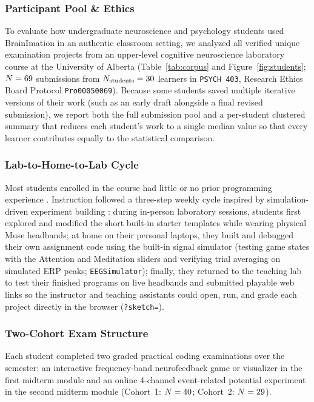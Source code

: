 \documentclass[11pt]{article}
\begin{document}
\subsubsection{Participant Pool \& Ethics}
To evaluate how undergraduate neuroscience and psychology students used BrainImation in an authentic classroom setting, we analyzed all verified unique examination projects from an upper-level cognitive neuroscience laboratory course at the University of Alberta (Table~\ref{tab:corpus} and Figure~\ref{fig:students}; $N = 69$ submissions from $N_{\text{students}} = 30$ learners in \texttt{PSYCH 403}, Research Ethics Board Protocol \texttt{Pro00050069}). Because some students saved multiple iterative versions of their work (such as an early draft alongside a final revised submission), we report both the full submission pool and a per-student clustered summary that reduces each student's work to a single median value so that every learner contributes equally to the statistical comparison.

\subsubsection{Lab-to-Home-to-Lab Cycle}
Most students enrolled in the course had little or no prior programming experience \citep{hatton2023quantitative,smith2024lowcost,iemi2026icancode}. Instruction followed a three-step weekly cycle inspired by simulation-driven experiment building \citep{deleeuw2023simulating}: during in-person laboratory sessions, students first explored and modified the short built-in starter templates while wearing physical Muse headbands; at home on their personal laptops, they built and debugged their own assignment code using the built-in signal simulator (testing game states with the Attention and Meditation sliders and verifying trial averaging on simulated ERP peaks; \texttt{EEGSimulator}); finally, they returned to the teaching lab to test their finished programs on live headbands and submitted playable web links so the instructor and teaching assistants could open, run, and grade each project directly in the browser (\texttt{?sketch=}).

\subsubsection{Two-Cohort Exam Structure}
Each student completed two graded practical coding examinations over the semester: an interactive frequency-band neurofeedback game or visualizer in the first midterm module and an online 4-channel event-related potential experiment in the second midterm module (Cohort~1: $N = 40$; Cohort~2: $N = 29$).
\end{document}
